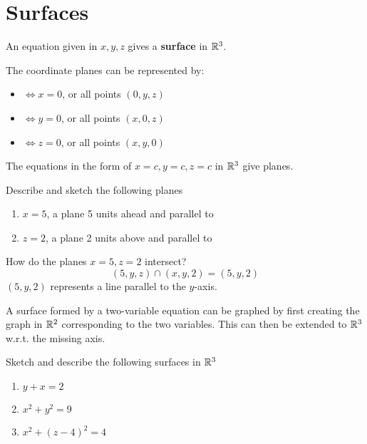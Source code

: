 \documentclass[twoside]{report}
\begin{document}
    \section{Surfaces}
    \begin{definition}[Surfaces]
        An equation given in $x, y, z$ gives a \textbf{surface} in $\mathbb{R}^{3}$.
    \end{definition}
    The coordinate planes can be represented by:
    \begin{itemize}
        \item \yz $\iff x = 0$, or all points $(0, y, z)$
        \item \xz $\iff y = 0$, or all points $(x, 0, z)$
        \item \xy $\iff z = 0$, or all points $(x, y, 0)$
    \end{itemize}
    The equations in the form of $x = c, y = c, z = c$ in $\mathbb{R}^{3}$ give planes.
    \begin{example}
        Describe and sketch the following planes
        \begin{enumerate}
            \item $x = 5$, a plane 5 units ahead and parallel to \yz
            \item $z = 2$, a plane 2 units above and parallel to \xy
        \end{enumerate}
    \end{example}
    \begin{example}
        How do the planes $x = 5, z = 2$ intersect?
        \begin{equation}
            (5, y, z) \cap (x, y, 2) = (5, y, 2)
        \end{equation}
        $(5, y, 2)$ represents a line parallel to the $y$-axis.
    \end{example}
    \begin{method}
        A surface formed by a two-variable equation can be graphed by first creating the graph in $\mathbb{R}^{2}$ corresponding to the two variables. This can then be extended to $\mathbb{R}^{3}$ w.r.t. the missing axis.
    \end{method}
    \begin{example}
        Sketch and describe the following surfaces in $\mathbb{R}^{3}$
        \begin{enumerate}
            \item $y + x = 2$
            \item $x^{2} + y^{2} = 9$
            \item $x^{2} + (z-4)^{2} = 4$
        \end{enumerate}
    \end{example}
\end{document}

